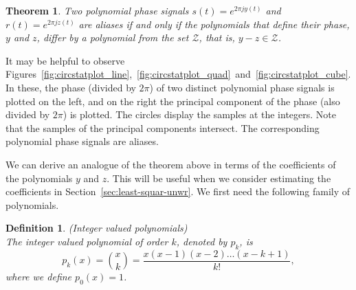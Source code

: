 \documentclass[aap,preprint]{imsart}
\newtheorem{corollary}{Corollary}
\newtheorem{theorem}{Theorem}
\newtheorem{definition}{Definition}
\begin{document}
\begin{theorem}\label{thm:circpolysampledthm}
Two polynomial phase signals $s(t) = e^{2\pi j y(t)}$  and $r(t) = e^{2\pi j z(t)}$  are aliases if and only if the polynomials that define their phase, $y$ and $z$, differ by a polynomial from the set $\mathcal{Z}$, that is, $y - z \in \mathcal{Z}$.
\end{theorem}



It may be helpful to observe Figures~\ref{fig:circstatplot_line},~\ref{fig:circstatplot_quad}~and~\ref{fig:circstatplot_cube}.  In these, the phase (divided by $2\pi$) of two distinct polynomial phase signals is plotted on the left, and on the right the principal component of the phase (also divided by $2\pi$) is plotted.  The circles display the samples at the integers. Note that the samples of the principal components intersect.  The corresponding polynomial phase signals are aliases.

We can derive an analogue of the theorem above in terms of the coefficients of the polynomials $y$ and $z$. This will be useful when we consider estimating the coefficients in Section~\ref{sec:least-squar-unwr}.  We first need the following family of polynomials. 

\begin{definition} \emph{(Integer valued polynomials)} \label{def:intvaledpolys}
\\The integer valued polynomial of order $k$, denoted by $p_k$, is
\[
p_k(x) = \binom{x}{k} = \frac{x(x-1)(x-2)\dots(x-k+1)}{k!},
\]
where we define $p_0(x) = 1$.
\end{definition}
\end{document}
